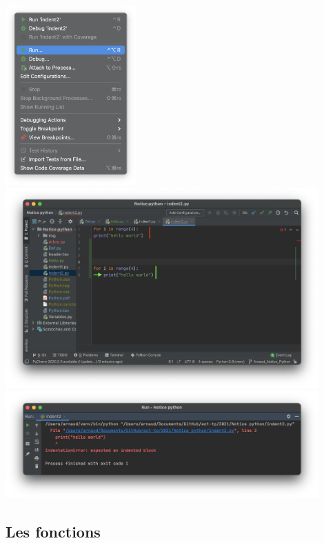 \begin{center}
\includegraphics[width=5cm]{run1.png}	
\includegraphics[width=12cm]{indent.png}	
\includegraphics[width=12cm]{indenterror.png}	
\end{center}


\subsection{Les fonctions}

